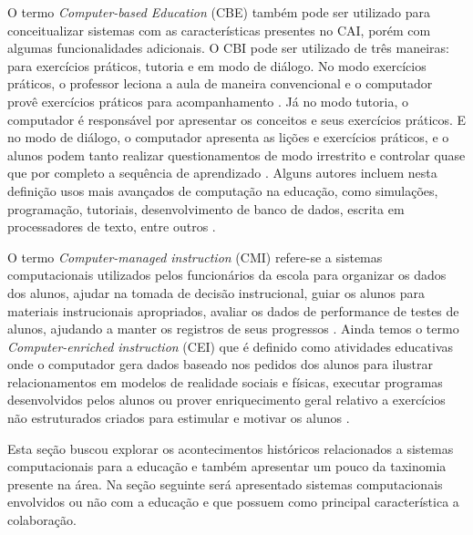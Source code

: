 O termo \emph{Computer-based Education} (CBE) também pode ser utilizado para conceitualizar sistemas com as características presentes no CAI, porém com algumas funcionalidades adicionais. O CBI pode ser utilizado de três maneiras: para exercícios práticos, tutoria e em modo de diálogo. No modo exercícios práticos, o  professor leciona a aula de maneira convencional e o computador provê exercícios práticos para acompanhamento \cite{wheres98}. Já no modo tutoria, o computador é responsável por apresentar os conceitos e seus exercícios práticos. E no modo de diálogo, o computador apresenta as lições e exercícios práticos, e o alunos podem tanto realizar questionamentos de modo irrestrito e controlar quase que por completo a sequência de aprendizado \cite{wheres98}. Alguns autores incluem nesta definição usos mais avançados de computação na educação, como simulações, programação, tutoriais, desenvolvimento de banco de dados, escrita em processadores de texto, entre outros \cite{cotton91}.

O termo \emph{Computer-managed instruction} (CMI) refere-se a sistemas computacionais utilizados pelos funcionários da escola para organizar os dados dos alunos, ajudar na tomada de decisão instrucional, guiar os alunos para materiais instrucionais apropriados, avaliar os dados de performance de testes de alunos, ajudando a manter os registros de seus progressos \cite{cotton91, wheres98}. Ainda temos o termo \emph{Computer-enriched instruction} (CEI) que é definido como atividades educativas onde o computador gera dados baseado nos pedidos dos alunos para ilustrar relacionamentos em modelos de realidade sociais e físicas, executar programas desenvolvidos pelos alunos ou prover enriquecimento geral relativo a exercícios não estruturados criados para estimular e motivar os alunos \cite{cotton91}.

Esta seção buscou explorar os acontecimentos históricos relacionados a sistemas computacionais para a educação e também apresentar um pouco da taxinomia presente na área. Na seção seguinte será apresentado sistemas computacionais envolvidos ou não com a educação e que possuem como principal característica a colaboração.



